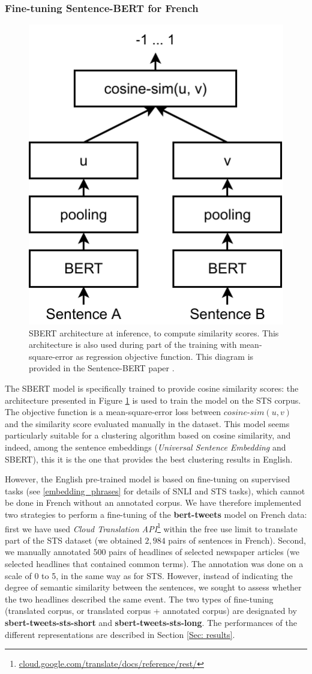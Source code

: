 \subsubsection{Fine-tuning Sentence-BERT for French}
\label{Subsec: Fine-tuning}
\begin{figure}[h]
  \centering
  \includegraphics[width=.3\linewidth]{figures/SentenceBERT.pdf}
  \caption{SBERT architecture at inference, to compute similarity scores. This architecture is also used during part of the training with mean-square-error as regression objective function. This diagram is provided in the Sentence-BERT paper \cite{reimers_2019_sentence}.}
  \label{Fig:SBERT}
\end{figure}
The SBERT model is specifically trained to provide cosine similarity scores: the architecture presented in Figure \ref{Fig:SBERT} is used to train the model
on the STS corpus. The objective function is a mean-square-error loss between $cosine\text{-}sim(u,v)$ and the similarity score evaluated manually in the dataset. This model seems particularly suitable for a clustering algorithm based on cosine similarity, and indeed, among the sentence embeddings (\textit{Universal Sentence Embedding} and SBERT), this it is the one that provides the best clustering results in English.

However, the English pre-trained model is based on fine-tuning on supervised tasks (see \ref{embedding_phrases} for details of SNLI and STS tasks), which cannot be done in French without an annotated corpus. We have therefore implemented two strategies to perform a fine-tuning of the \textbf{bert-tweets} model on French data: first we have used \textit{Cloud Translation API}\footnote{\url{cloud.google.com/translate/docs/reference/rest/}} within the free use limit to translate part of the STS dataset (we obtained $2,984$ pairs of sentences in French). Second, we manually annotated 500 pairs of headlines of selected newspaper articles (we selected headlines that contained common terms). The annotation was done on a scale of 0 to 5, in the same way as for STS. However, instead of indicating the degree of semantic similarity between the sentences, we sought to assess whether the two headlines described the same event. The two types of fine-tuning (translated corpus, or translated corpus + annotated corpus) are designated by \textbf{sbert-tweets-sts-short} and \textbf{sbert-tweets-sts-long}. The performances of the different representations are described in Section \ref{Sec: results}.

